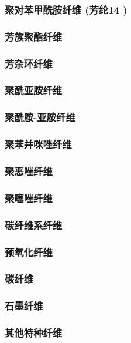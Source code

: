 \documentclass[UTF8]{../../ApplicationUniverse}
\begin{document}
            \subsubsection{聚对苯甲酰胺纤维 (芳纶14 )}
            \subsubsection{芳族聚酯纤维}
        \subsubsection{芳杂环纤维}
            \subsubsection{聚酰亚胺纤维}
            \subsubsection{聚酰胺-亚胺纤维}
            \subsubsection{聚苯并咪唑纤维}
            \subsubsection{聚恶唑纤维}
            \subsubsection{聚噻唑纤维}
        \subsubsection{碳纤维系纤维}
            \subsubsection{预氧化纤维}
            \subsubsection{碳纤维}
            \subsubsection{石墨纤维}
        \subsubsection{其他特种纤维}
\end{document}
